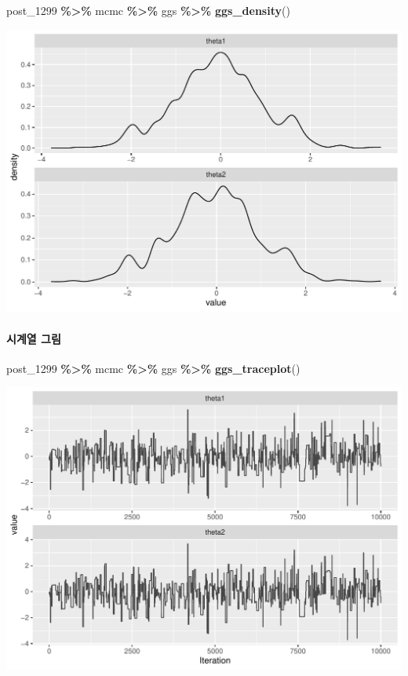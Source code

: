 \documentclass[
]{article}
\newenvironment{Shaded}{\begin{snugshade}}{\end{snugshade}}
\newcommand{\FunctionTok}[1]{\textcolor[rgb]{0.13,0.29,0.53}{\textbf{#1}}}
\newcommand{\NormalTok}[1]{#1}
\newcommand{\SpecialCharTok}[1]{\textcolor[rgb]{0.81,0.36,0.00}{\textbf{#1}}}
\begin{document}
\begin{Shaded}
\begin{Highlighting}[]
\NormalTok{post\_1299 }\SpecialCharTok{\%\textgreater{}\%}\NormalTok{ mcmc }\SpecialCharTok{\%\textgreater{}\%}\NormalTok{ ggs }\SpecialCharTok{\%\textgreater{}\%} \FunctionTok{ggs\_density}\NormalTok{()}
\end{Highlighting}
\end{Shaded}

\begin{center}\includegraphics[width=0.8\linewidth]{Bayes_stat_hw3_files/figure-latex/unnamed-chunk-9-2} \end{center}

\paragraph{시계열 그림}\label{uxc2dcuxacc4uxc5f4-uxadf8uxb9bc-1}

\begin{Shaded}
\begin{Highlighting}[]
\NormalTok{post\_1299 }\SpecialCharTok{\%\textgreater{}\%}\NormalTok{ mcmc }\SpecialCharTok{\%\textgreater{}\%}\NormalTok{ ggs }\SpecialCharTok{\%\textgreater{}\%} \FunctionTok{ggs\_traceplot}\NormalTok{()}
\end{Highlighting}
\end{Shaded}

\begin{center}\includegraphics[width=0.8\linewidth]{Bayes_stat_hw3_files/figure-latex/unnamed-chunk-10-1} \end{center}
\end{document}
